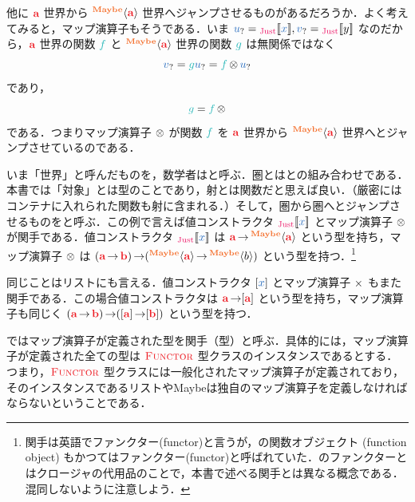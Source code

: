 \documentclass[a5paper,twoside,fleqn,draft]{jsbook}
\begin{document}
他に $\hTypeName{a}$ 世界から $\hMaybeConstruct{\hTypeName{a}}$ 世界へジャンプさせるものがあるだろうか．よく考えてみると，マップ演算子もそうである．いま $\hMaybeVar{u}=\hJustWith{\hVar{x}},\hMaybeVar{v}=\hJustWith{y}$ なのだから，$\hTypeName{a}$ 世界の関数 $\hFunc{f}$ と $\hMaybeConstruct{\hTypeName{a}}$ 世界の関数 $\hFunc{g}$ は無関係ではなく
\begin{equation}
  \hMaybeVar{v}
  =\hFunc{g}\hMaybeVar{u}
  =\hFunc{f}\hFunctorMap\hMaybeVar{u}
\end{equation}
であり，
\begin{equation}
  \hFunc{g}
  =\hFunc{f}\hFunctorMap
\end{equation}
である．つまりマップ演算子 $\operatorname{\otimes}$ が関数 $\hFunc{f}$ を $\hTypeName{a}$ 世界から $\hMaybeConstruct{\hTypeName{a}}$ 世界へとジャンプさせているのである．

いま「世界」と呼んだものを，数学者はと呼ぶ．圏とはとの組み合わせである．本書では「対象」とは型のことであり，射とは関数だと思えば良い．（厳密にはコンテナに入れられた関数も射に含まれる．）そして，圏から圏へとジャンプさせるものをと呼ぶ．この例で言えば値コンストラクタ $\hJustWith{\hVar{x}}$ とマップ演算子 $\operatorname{\otimes}$ が関手である．値コンストラクタ $\hJustWith{\hVar{x}}$ は $\hTypeName{a}\hFunctionArrow\hMaybeConstruct{\hTypeName{a}}$ という型を持ち，マップ演算子 $\operatorname{\otimes}$ は $(\hTypeName{a}\hFunctionArrow\hTypeName{b})\hFunctionArrow(\hMaybeConstruct{\hTypeName{a}}\hFunctionArrow\hMaybeConstruct{b})$ という型を持つ．\footnote{関手は英語でファンクター(functor)と言うが，\cxx の関数オブジェクト (function object) もかつてはファンクター(functor)と呼ばれていた．\cxx のファンクターとはクロージャの代用品のことで，本書で述べる関手とは異なる概念である．混同しないように注意しよう．}

同じことはリストにも言える．値コンストラクタ $[\hVar{x}]$ とマップ演算子 $\operatorname{\times}$ もまた関手である．この場合値コンストラクタは $\hTypeName{a}\hFunctionArrow\hListConstruct{\hTypeName{a}}$ という型を持ち，マップ演算子も同じく $(\hTypeName{a}\hFunctionArrow\hTypeName{b})\hFunctionArrow(\hListConstruct{\hTypeName{a}}\hFunctionArrow[\hTypeName{b}])$ という型を持つ．

\separator

\haskell ではマップ演算子が定義された型を関手（型）と呼ぶ．具体的には，マップ演算子が定義された全ての型は $\hFunctor$ 型クラスのインスタンスであるとする．つまり，$\hFunctor$ 型クラスには一般化されたマップ演算子が定義されており，そのインスタンスであるリストやMaybeは独自のマップ演算子を定義しなければならないということである．
\end{document}
